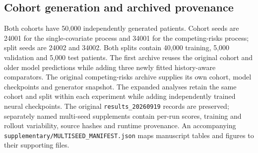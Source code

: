 \subsection{Cohort generation and archived provenance}
Both cohorts have 50,000 independently generated patients. Cohort seeds are 24001 for the single-covariate process and 34001 for the competing-risks process; split seeds are 24002 and 34002. Both splits contain 40,000 training, 5,000 validation and 5,000 test patients. The first archive reuses the original cohort and older model predictions while adding three newly fitted history-aware comparators. The original competing-risks archive supplies its own cohort, model checkpoints and generator snapshot. The expanded analyses retain the same cohort and split within each experiment while adding independently trained neural checkpoints. The original \texttt{results\_20260919} records are preserved; separately named multi-seed supplements contain per-run scores, training and rollout variability, source hashes and runtime provenance. An accompanying \texttt{supplementary/MULTISEED\_MANIFEST.json} maps manuscript tables and figures to their supporting files.
